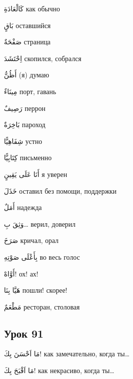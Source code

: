 \documentclass[a5paper]{article}
\newcommand\textstyleDropCaps[1]{#1}
\newcommand\textstyleCaptioncharacters[1]{#1}
\begin{document}
\textstyleCaptioncharacters{كَالْعَادَةِ }\textstyleDropCaps{как обычно‎}

\textstyleCaptioncharacters{بَاقٍ }\textstyleDropCaps{оставшийся‎}

\textstyleCaptioncharacters{صَفْحَةٌ }\textstyleDropCaps{страница‎}

\textstyleCaptioncharacters{اِحْتَشَدَ }\textstyleDropCaps{скопился, со­брался‎}

\textstyleCaptioncharacters{أَظُنُّ }\textstyleDropCaps{(я) думаю‎}

\textstyleCaptioncharacters{مِينَاءٌ }\textstyleDropCaps{порт, гавань‎}

\textstyleCaptioncharacters{رَصِيفٌ }\textstyleDropCaps{перрон‎}

\textstyleCaptioncharacters{بَاخِرَةٌ }\textstyleDropCaps{пароход‎}

\textstyleCaptioncharacters{شِفَاهِيًّا }\textstyleDropCaps{устно‎}

\textstyleCaptioncharacters{كِتَابِيًّا }\textstyleDropCaps{письменно‎}

\textstyleCaptioncharacters{أَنَا عَلَى يَقِينٍ }\textstyleDropCaps{я уверен‎}

\textstyleCaptioncharacters{خَذَلَ }\textstyleDropCaps{оставил без помо­щи, поддержки‎}

\textstyleCaptioncharacters{أَمَلٌ }\textstyleDropCaps{надежда‎}

\textstyleCaptioncharacters{وَثِقَ بِ… }\textstyleDropCaps{верил, дове­рил‎}

\textstyleCaptioncharacters{صَرَخَ }\textstyleDropCaps{кричал, орал‎}

\textstyleCaptioncharacters{بِأَعْلَى صَوْتِهِ }\textstyleDropCaps{во весь го­лос‎}

\textstyleCaptioncharacters{أَوَّاهْ! }\textstyleDropCaps{ох! ах!‎}

\textstyleCaptioncharacters{هَيَّا بِنَا }\textstyleDropCaps{пошли! скорее!‎}

\textstyleCaptioncharacters{مَطْعَمٌ }\textstyleDropCaps{ресторан, столовая‎}

\subsection[Урок 91‎]{\textstyleDropCaps{Урок 91‎}}
\textstyleCaptioncharacters{مَا اَحْسَنَ بِكَ! }\textstyleDropCaps{как заме­чательно, когда ты…‎}

\textstyleCaptioncharacters{مَا اَقْبَحَ بِكَ! }\textstyleDropCaps{как некрасив­о, когда ты…‎}
\end{document}
